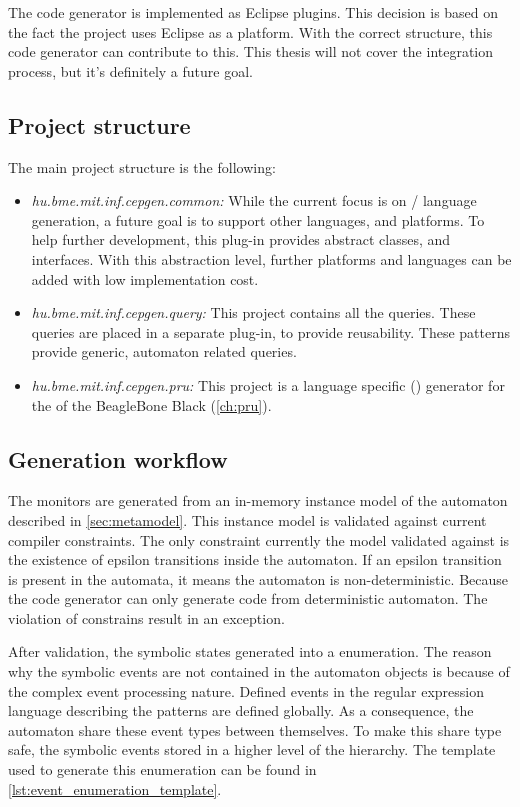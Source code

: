 The code generator is implemented as Eclipse plugins. This decision is based on the fact the \viatrac{} project uses Eclipse as a platform. With the correct structure, this code generator can contribute to this. This thesis will not cover the integration process, but it's definitely a future goal.

\subsection{Project structure}

The main project structure is the following:
\begin{itemize}
	\item \emph{hu.bme.mit.inf.cepgen.common:} While the current focus is on \cpl/\cpp{} language generation, a future goal is to support other languages, and platforms. To help further development, this plug-in provides abstract classes, and interfaces. With this abstraction level, further platforms and languages can be added with low implementation cost.
	\item \emph{hu.bme.mit.inf.cepgen.query:} This project contains all the \viatraq{} queries. These queries are placed in a separate plug-in, to provide reusability. These patterns provide generic, automaton related queries.
	\item \emph{hu.bme.mit.inf.cepgen.pru:} This project is a language specific (\cpl{}) generator for the \pru{} of the BeagleBone Black (\cref{ch:pru}).
\end{itemize}

\subsection{Generation workflow}

The monitors are generated from an in-memory instance model of the automaton described in \cref{sec:metamodel}. This instance model is validated against current compiler constraints. The only constraint currently the model validated against is the existence of epsilon transitions inside the automaton. If an epsilon transition is present in the automata, it means the automaton is non-deterministic. Because the code generator can only generate code from deterministic automaton. The violation of constrains result in an exception.

After validation, the symbolic states generated into a \cpp{} enumeration. The reason why the symbolic events are not contained in the automaton objects is because of the complex event processing nature. Defined events in the regular expression language describing the patterns are defined globally. As a consequence, the automaton share these event types between themselves. To make this share type safe, the symbolic events stored in a higher level of the hierarchy. The template used to generate this enumeration can be found in \cref{lst:event_enumeration_template}.


